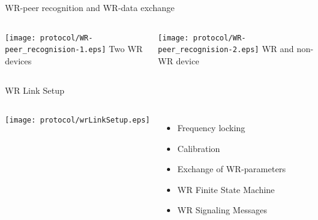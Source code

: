 \documentclass[compress,red]{beamer}
\begin{document}
\begin{frame}{WR-peer recognition and WR-data exchange}

  \begin{columns}[c]

    \begin{center}
    \texttt{[image: protocol/WR-peer\_recognision-1.eps]}
    \newline
    Two WR devices
    \end{center}
    

    \begin{center}
    \texttt{[image: protocol/WR-peer\_recognision-2.eps]}
    \newline
    WR and non-WR device
    \end{center}
     
  \end{columns}

\end{frame}
\begin{frame}{WR Link Setup }

  \begin{columns}[c]

      \begin{center}
      \texttt{[image: protocol/wrLinkSetup.eps]}
      \end{center}



      \begin{itemize}
	\item Frequency locking
	\item Calibration
	\item Exchange of WR-parameters
	\item WR Finite State Machine
	\item WR Signaling Messages
      \end{itemize}

  \end{columns}

\end{frame}
\end{document}
